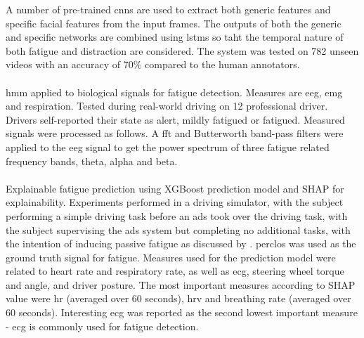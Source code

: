 \documentclass[11pt, parskip=half*,twoside=false]{scrbook}
\begin{document}
A number of pre-trained \glspl{cnn} are used to extract both generic features and specific facial features from the input frames. The outputs of both the generic and specific networks are combined using \glspl{lstm} so taht the temporal nature of both fatigue and distraction are considered. The system was tested on 782 unseen videos with an accuracy of 70\% compared to the human annotators.

\paragraph{\citet{fuDynamicDriverFatigue2016}} \gls{hmm} applied to biological signals for fatigue detection. Measures are \gls{eeg}, \gls{emg} and respiration. Tested during real-world driving on 12 professional driver. Drivers self-reported their state as alert, mildly fatigued or fatigued. Measured signals were processed as follows. A \gls{fft} and Butterworth band-pass filters were applied to the \gls{eeg} signal to get the power spectrum of three fatigue related frequency bands, theta, alpha and beta. 



\paragraph{\citet{zhouPredictingDriverFatigue2021}} Explainable fatigue prediction using XGBoost prediction model and SHAP for explainability.  Experiments performed in a driving simulator, with the subject performing a simple driving task before an \gls{ads} took over the driving task, with the subject supervising the \gls{ads} system but completing no additional tasks, with the intention of inducing passive fatigue as discussed by \citep{goncalvesDrowsinessConditionalAutomation2016}. \gls{perclos} was used as the ground truth signal for fatigue. Measures used for the prediction model were related to heart rate and respiratory rate, as well as \gls{ecg}, steering wheel torque and angle, and driver posture. The most important measures according to SHAP value were \gls{hr} (averaged over 60 seconds), \gls{hrv} and breathing rate (averaged over 60 seconds). Interesting \gls{ecg} was reported as the second lowest important measure - \gls{ecg} is commonly used for fatigue detection.  
	
\end{document}
